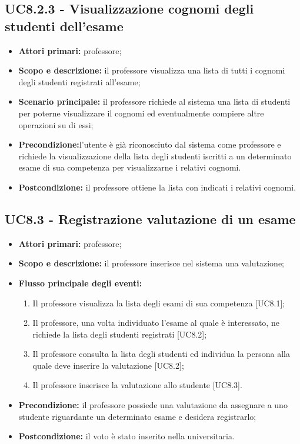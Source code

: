 \documentclass[AnalisiDeiRequisiti.tex]{subfiles}
\begin{document}
\subsection{UC8.2.3 - Visualizzazione cognomi degli studenti dell'esame}
\begin{itemize}
	\item \textbf{Attori primari:} professore;
	\item \textbf{Scopo e descrizione:} il professore visualizza una lista di tutti i cognomi degli studenti registrati all'esame;
	\item \textbf{Scenario principale:} il professore richiede al sistema una lista di studenti per poterne visualizzare il cognomi ed eventualmente compiere altre operazioni su di essi;
	\item \textbf{Precondizione:}l'utente è già riconosciuto dal sistema come professore e richiede la visualizzazione della lista degli studenti iscritti a un determinato esame di sua competenza per visualizzarne i relativi cognomi.
	\item \textbf{Postcondizione:} il professore ottiene la lista con indicati i relativi cognomi.
\end{itemize}

\subsection{UC8.3 - Registrazione valutazione di un esame}
\begin{itemize}
	\item \textbf{Attori primari:} professore;
	\item \textbf{Scopo e descrizione:} il professore inserisce nel sistema una valutazione;
	\item \textbf{Flusso principale degli eventi:}
	\begin{enumerate}
		\item Il professore visualizza la lista degli esami di sua competenza [UC8.1];
		\item Il professore, una volta individuato l'esame al quale è interessato, ne richiede la lista degli studenti registrati [UC8.2];
		\item Il professore consulta la lista degli studenti ed individua la persona alla quale deve inserire la valutazione [UC8.2];
		\item Il professore inserisce la valutazione allo studente [UC8.3].
	\end{enumerate}
	\item \textbf{Precondizione:} il professore possiede una valutazione da assegnare a uno studente riguardante un determinato esame e desidera registrarlo;
	\item \textbf{Postcondizione:} il voto è stato inserito nella  universitaria.
\end{itemize}
\end{document}
